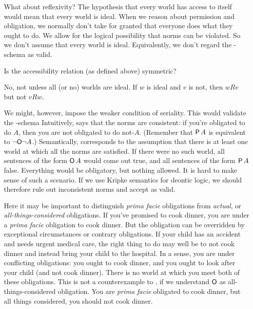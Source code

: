 What about reflexivity? The hypothesis that every world has access to itself
would mean that every world is ideal. When we reason about permission and
obligation, we normally don't take for granted that everyone does what they
ought to do. We allow for the logical possibility that norms can be violated. So
we don't assume that every world is ideal. Equivalently, we don't regard the
-schema
%
%
as valid.

\begin{exercise}
  Is the accessibility relation (as defined above) symmetric?
\end{exercise}
\begin{solution}
  No, not unless all (or no) worlds are ideal. If $w$ is ideal and $v$ is not,
  then $wRv$ but not $vRw$.
\end{solution}

We might, however, impose the weaker condition of seriality. This would
validate the -schema
%
%
Intuitively,  says that the norms are consistent: if you're obligated to
do $A$, then you are not obligated to do not-$A$. (Remember that $\operatorname{\mathsf{P}} A$ is
equivalent to $\neg\! \operatorname{\mathsf{O}}\! \neg A$.) Semantically,  corresponds to the
assumption that there is at least one world at which all the norms are
satisfied. If there were no such world, all sentences of the form $\operatorname{\mathsf{O}} A$ would
come out true, and all sentences of the form $\operatorname{\mathsf{P}} A$ false. Everything would be
obligatory, but nothing allowed. It is hard to make sense of such a scenario. If
we use Kripke semantics for deontic logic, we should therefore rule out
inconsistent norms and accept  as valid.

Here it may be important to distinguish \emph{prima facie} obligations from
\emph{actual}, or \emph{all-things-considered} obligations. If you've promised
to cook dinner, you are under a \emph{prima facie} obligation to cook dinner.
But the obligation can be overridden by exceptional circumstances or contrary
obligations. If your child has an accident and needs urgent medical care, the
right thing to do may well be to not cook dinner and instead bring your child to
the hospital. In a sense, you are under conflicting obligations: you ought to
cook dinner, and you ought to look after your child (and not cook dinner). There
is no world at which you meet both of these obligations. This is not a
counterexample to , if we understand $\operatorname{\mathsf{O}}$ as all-things-considered
obligation. You are \emph{prima facie} obligated to cook dinner, but all things
considered, you should not cook dinner.

